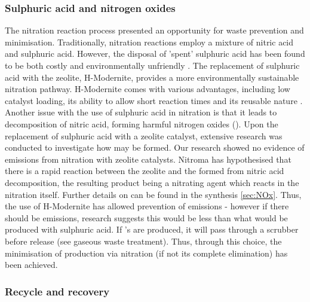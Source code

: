 \subsubsection{Sulphuric acid and nitrogen oxides}
The nitration reaction process presented an opportunity for waste prevention and minimisation. Traditionally, nitration reactions employ a mixture of nitric acid and sulphuric acid. However, the disposal of 'spent' sulphuric acid has been found to be both costly and environmentally unfriendly \cite{smith_superior_1996}. The replacement of sulphuric acid with the zeolite, H-Modernite, provides a more environmentally sustainable nitration pathway. H-Modernite comes with various advantages, including low catalyst loading, its ability to allow short reaction times and its reusable nature \cite{smith_superior_1996}. Another issue with the use of sulphuric acid in nitration is that it leads to decomposition of nitric acid, forming harmful nitrogen oxides (). Upon the replacement of sulphuric acid with a zeolite catalyst, extensive research was conducted to investigate how  may be formed. Our research showed no evidence of  emissions from nitration with zeolite catalysts. Nitroma has hypothesised that there is a rapid reaction between the zeolite and the  formed from nitric acid decomposition, the resulting product being a nitrating agent which reacts in the nitration itself. Further details on can be found in the synthesis \cref{sec:NOx}. Thus, the use of H-Modernite has allowed prevention of  emissions - however if there should be  emissions, research suggests this would be less than what would be produced with sulphuric acid. If 's are produced, it will pass through a scrubber before release (see gaseous waste treatment). Thus, through this choice, the minimisation of  production via nitration (if not its complete elimination) has been achieved. 

\subsubsection{Recycle and recovery}

